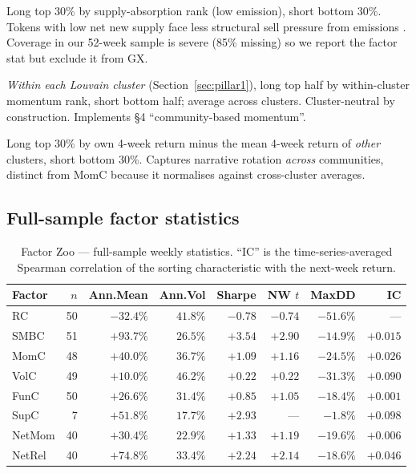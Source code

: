 \documentclass[11pt,a4paper]{article}
\begin{document}
\begin{description}[topsep=2pt,itemsep=2pt,leftmargin=1.2em]
\item[SupC --- supply absorption.] Long top 30\% by supply-absorption rank (low emission), short bottom 30\%. Tokens with low net new supply face less structural sell pressure from emissions \citep{raamv2}. Coverage in our 52-week sample is severe (85\% missing) so we report the factor stat but exclude it from GX.
\item[NetMom --- within-cluster momentum.] \emph{Within each Louvain cluster} (Section~\ref{sec:pillar1}), long top half by within-cluster momentum rank, short bottom half; average across clusters. Cluster-neutral by construction. Implements \citet{liu2018timevarying} §4 ``community-based momentum''.
\item[NetRel --- cross-cluster relative.] Long top 30\% by own 4-week return minus the mean 4-week return of \emph{other} clusters, short bottom 30\%. Captures narrative rotation \emph{across} communities, distinct from MomC because it normalises against cross-cluster averages.
\end{description}

\subsection{Full-sample factor statistics}

\begin{table}[H]
\centering
\caption{Factor Zoo --- full-sample weekly statistics. ``IC'' is the time-series-averaged Spearman correlation of the sorting characteristic with the next-week return.}
\label{tab:zoo}
\small
\begin{tabular}{lrrrrrrr}
\toprule
Factor & $n$ & Ann.Mean & Ann.Vol & Sharpe & NW $t$ & MaxDD & IC \\
\midrule
RC      & 50 & $-32.4\%$ & $41.8\%$ & $-0.78$ & $-0.74$ & $-51.6\%$ & --- \\
SMBC    & 51 & $+93.7\%$ & $26.5\%$ & $+3.54$ & $+2.90$ & $-14.9\%$ & $+0.015$ \\
MomC    & 48 & $+40.0\%$ & $36.7\%$ & $+1.09$ & $+1.16$ & $-24.5\%$ & $+0.026$ \\
VolC    & 49 & $+10.0\%$ & $46.2\%$ & $+0.22$ & $+0.22$ & $-31.3\%$ & $+0.090$ \\
FunC    & 50 & $+26.6\%$ & $31.4\%$ & $+0.85$ & $+1.05$ & $-18.4\%$ & $+0.001$ \\
SupC    & 7  & $+51.8\%$ & $17.7\%$ & $+2.93$ & --- & $-1.8\%$ & $+0.098$ \\
NetMom  & 40 & $+30.4\%$ & $22.9\%$ & $+1.33$ & $+1.19$ & $-19.6\%$ & $+0.006$ \\
NetRel  & 40 & $+74.8\%$ & $33.4\%$ & $+2.24$ & $+2.14$ & $-18.6\%$ & $+0.046$ \\
\bottomrule
\end{tabular}
\end{table}
\end{document}
